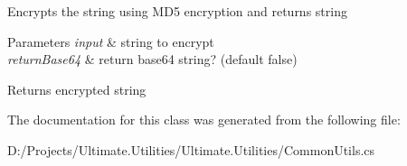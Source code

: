 Encrypts the string using M\+D5 encryption and returns string 


\begin{DoxyParams}{Parameters}
{\em input} & string to encrypt\\
\hline
{\em return\+Base64} & return base64 string? (default false)\\
\hline
\end{DoxyParams}
\begin{DoxyReturn}{Returns}
encrypted string
\end{DoxyReturn}


The documentation for this class was generated from the following file\+:\begin{DoxyCompactItemize}
\item 
D\+:/\+Projects/\+Ultimate.\+Utilities/\+Ultimate.\+Utilities/Common\+Utils.\+cs\end{DoxyCompactItemize}
